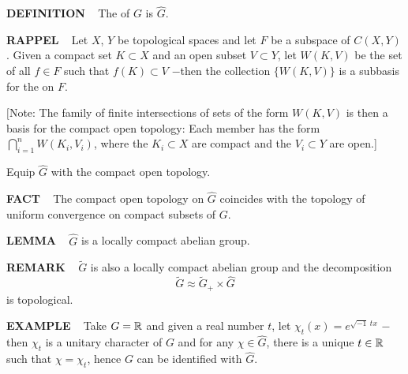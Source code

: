 \vspace{0.1cm}

\begin{x}{\small\bf DEFINITION} \ %
The 
of $G$ is $\widehat{G}$.
\end{x}

\vspace{0.1cm}

\begin{x}{\small\bf RAPPEL} \ %
Let $X$, $Y$ be topological spaces and let $F$ be a subspace of $C(X,Y)$.  
Given a compact set $K \subset X$ and an open subset $V \subset Y$, 
let $W(K,V)$ be the set of all $f \in F$ such that $f(K) \subset V$ 
$-$then the collection $\{W(K,V)\}$ is a subbasis for the 
on $F$.

\vspace{0.1cm}
$[$Note: The family of finite intersections of sets of the form $W(K,V)$ is then a basis for the compact open topology: 
Each member has the form $\bigcap\limits_{i= 1}^n W(K_i,V_i)$, where the $K_i \subset X$ 
are compact and the $V_i \subset Y$ are open.]
\end{x}

\vspace{0.1cm}

Equip $\widehat{G}$ with the compact open topology.
\vspace{0.1cm}
\begin{x}{\small\bf FACT} \ %
The compact open topology on $\widehat{G}$ coincides with the topology of uniform convergence on compact subsets of $G$.
\end{x}

\begin{x}{\small\bf LEMMA} \ %
$\widehat{G}$ is a locally compact abelian group.
\end{x}


\begin{x}{\small\bf REMARK} \ %
$\widetilde{G}$  is also a locally compact abelian group and the decomposition
\[
\widetilde{G} \approx \widetilde{G}_+ \times \widehat{G}
\]
is topological.
\end{x}
\vspace{0.1cm}

\begin{x}{\small\bf EXAMPLE} \ %
Take $G = \mathbb{R}$ and given a real number $t$, let $\chi_t(x) = e^{\sqrt{-1}\ tx}$ $-$then $\chi_t$ 
is a unitary character of $G$ and for any $\chi \in \widehat{G}$, there is a unique $t \in \mathbb{R}$ such that $\chi = \chi_t$, 
hence $G$ can be identified with $\widehat{G}$.
\end{x}

